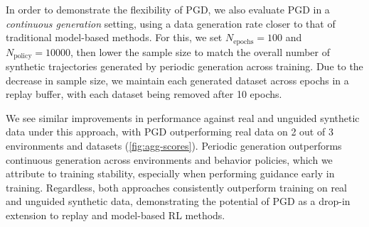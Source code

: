 \documentclass[10pt]{article} %
\theoremstyle{plain}
\theoremstyle{definition}
\theoremstyle{remark}
\begin{document}
\renewcommand{\arraystretch}{1}


In order to demonstrate the flexibility of PGD, we also evaluate PGD in a \textit{continuous generation} setting, using a data generation rate closer to that of traditional model-based methods. For this, we set $N_\text{epochs} = \num[group-separator={,}]{100}$ and $N_\text{policy} = \num[group-separator={,}]{10000}$, then lower the sample size to match the overall number of synthetic trajectories generated by periodic generation across training. Due to the decrease in sample size, we maintain each generated dataset across epochs in a replay buffer, with each dataset being removed after 10 epochs.

We see similar improvements in performance against real and unguided synthetic data under this approach, with PGD outperforming real data on 2 out of 3 environments and datasets (\autoref{fig:agg-scores}).
Periodic generation outperforms continuous generation across environments and behavior policies, which we attribute to training stability, especially when performing guidance early in training.
Regardless, both approaches consistently outperform training on real and unguided synthetic data, demonstrating the potential of PGD as a drop-in extension to replay and model-based RL methods.
\end{document}
